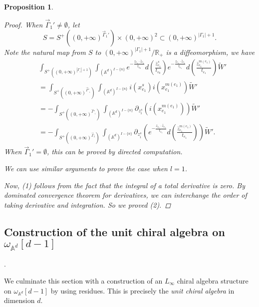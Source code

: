 \documentclass[11pt]{amsart}
\newtheorem{prop}[thm]{Proposition}
\theoremstyle{definition}
\theoremstyle{remark}
\numberwithin{equation}{section}
\begin{document}
\begin{prop}
\begin{proof}
        When $\vec{\Gamma}_{1}'\neq\emptyset$, let
        $$
        S=S^{+}((0,+\infty)^{\vec{\Gamma}_{1}'})\times(0,+\infty)^{2}\subset(0,+\infty)^{|\Gamma_{1}|+1}.
        $$
        Note the natural map from $S$ to $(0,+\infty)^{|\Gamma_{1}|+1}/\mathbb{R}_+$ is a diffeomorphism, we have
        \begin{align*}
            &\int_{S^{+}((0,+\infty)^{|\Gamma_{_{1}}|+1})}\int_{(\mathbb{A}^{d})^{ I-\{n\}}}
            e^{-\frac{z_{e_{1}}\cdot \bar{z}_{e_{1}}}{t_{e_{0}}}}d(\frac{\bar{z}_{e_{1}}^{s}}{t_{e_{0}}})e^{-\frac{z_{e_{1}}\cdot \bar{z}_{e_{1}}}{t_{e_{1}}}}d(\frac{\bar{z}_{e_{1}}^{m(e_{1})}}{t_{e_{1}}})\tilde{W}'\\
            &=
            \int_{S^{+}((0,+\infty)^{\vec{\Gamma}'_{_{1}}})}\int_{(\mathbb{A}^{d})^{ I-\{n\}}}i(x_{e_{1}}^{s})i(x_{e_{1}}^{m(e_{1})})\tilde{W}'\\
            &=
            -\int_{S^{+}((0,+\infty)^{\vec{\Gamma}'_{_{1}}})}\int_{(\mathbb{A}^{d})^{ I-\{n\}}}\partial_{z_{i}^{s}}(i(x_{e_{1}}^{m(e_{1})}))\tilde{W}'\\
            &=
            -\int_{S^{+}((0,+\infty)^{\vec{\Gamma}_{1}})}\int_{(\mathbb{A}^{d})^{ I-\{n\}}}\partial_{z_{i}^{s}}\left(e^{-\frac{z_{e_{1}}\cdot \bar{z}_{e_{1}}}{t_{e_{1}}}}d(\frac{\bar{z}_{e_{1}}^{m(e_{1})}}{t_{e_{1}}})\right)\tilde{W}'.
        \end{align*}
        When $\vec{\Gamma}_{1}'=\emptyset$, this can be proved by directed computation.

        We can use similar arguments to prove the case when $l=1$.

        Now, (1) follows from the fact that the integral of a total derivative is zero. By dominated convergence theorem for derivatives, we can interchange the order of taking derivative and integration. So we proved (2).
    \end{proof}
\end{prop}
\subsection{Construction of the unit chiral algebra on $\omega_{\mathbb{A}^{d}}[d-1]$}.

We culminate this section with a construction of an $L_{\infty}$ chiral algebra structure on $\omega_{\mathbb{A}^{d}}[d-1]$ by using residues.
This is precisely the \textit{unit chiral algebra} in dimension $d$.
\end{document}
